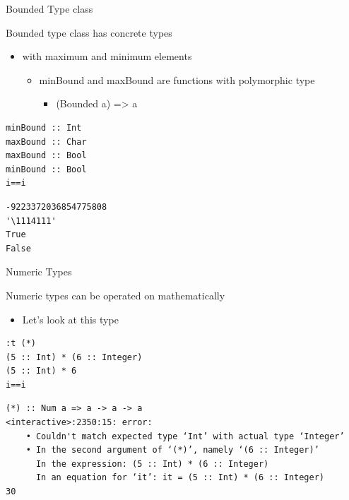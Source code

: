 \documentclass[presetation]{beamer}
\begin{document}
\begin{frame}[fragile,label={sec:org405c526}]{Bounded Type class}
 \begin{block}{Bounded type class has concrete types}
\begin{itemize}
\item with maximum and minimum elements
\begin{itemize}
\item minBound and maxBound are functions with polymorphic type
\begin{itemize}
\item (Bounded a) => a
\end{itemize}
\end{itemize}
\end{itemize}
\begin{verbatim}
minBound :: Int
maxBound :: Char
maxBound :: Bool
minBound :: Bool
i==i
\end{verbatim}

\begin{verbatim}
-9223372036854775808
'\1114111'
True
False
\end{verbatim}
\end{block}
\end{frame}

\begin{frame}[fragile,label={sec:org34ee6a4}]{Numeric Types}
 \begin{block}{Numeric types can be operated on mathematically}
\begin{itemize}
\item Let's look at this type
\end{itemize}
\begin{verbatim}
:t (*)
(5 :: Int) * (6 :: Integer)
(5 :: Int) * 6
i==i
\end{verbatim}

\begin{verbatim}
(*) :: Num a => a -> a -> a
<interactive>:2350:15: error:
    • Couldn't match expected type ‘Int’ with actual type ‘Integer’
    • In the second argument of ‘(*)’, namely ‘(6 :: Integer)’
      In the expression: (5 :: Int) * (6 :: Integer)
      In an equation for ‘it’: it = (5 :: Int) * (6 :: Integer)
30
\end{verbatim}
\end{block}
\end{frame}
\end{document}
